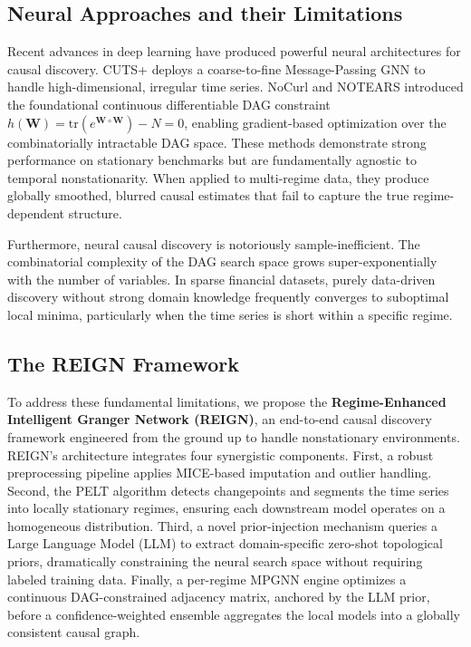 \subsection{Neural Approaches and their Limitations}

Recent advances in deep learning have produced powerful neural architectures for causal discovery. CUTS+ \cite{cheng2023cuts} deploys a coarse-to-fine Message-Passing GNN to handle high-dimensional, irregular time series. NoCurl and NOTEARS \cite{zheng2018dags} introduced the foundational continuous differentiable DAG constraint $h(\mathbf{W}) = \text{tr}(e^{\mathbf{W} \circ \mathbf{W}}) - N = 0$, enabling gradient-based optimization over the combinatorially intractable DAG space. These methods demonstrate strong performance on stationary benchmarks but are fundamentally agnostic to temporal nonstationarity. When applied to multi-regime data, they produce globally smoothed, blurred causal estimates that fail to capture the true regime-dependent structure.

Furthermore, neural causal discovery is notoriously sample-inefficient. The combinatorial complexity of the DAG search space grows super-exponentially with the number of variables. In sparse financial datasets, purely data-driven discovery without strong domain knowledge frequently converges to suboptimal local minima, particularly when the time series is short within a specific regime.

\subsection{The REIGN Framework}

To address these fundamental limitations, we propose the \textbf{Regime-Enhanced Intelligent Granger Network (REIGN)}, an end-to-end causal discovery framework engineered from the ground up to handle nonstationary environments. REIGN's architecture integrates four synergistic components. First, a robust preprocessing pipeline applies MICE-based imputation and outlier handling. Second, the PELT algorithm detects changepoints and segments the time series into locally stationary regimes, ensuring each downstream model operates on a homogeneous distribution. Third, a novel prior-injection mechanism queries a Large Language Model (LLM) to extract domain-specific zero-shot topological priors, dramatically constraining the neural search space without requiring labeled training data. Finally, a per-regime MPGNN engine optimizes a continuous DAG-constrained adjacency matrix, anchored by the LLM prior, before a confidence-weighted ensemble aggregates the local models into a globally consistent causal graph.

